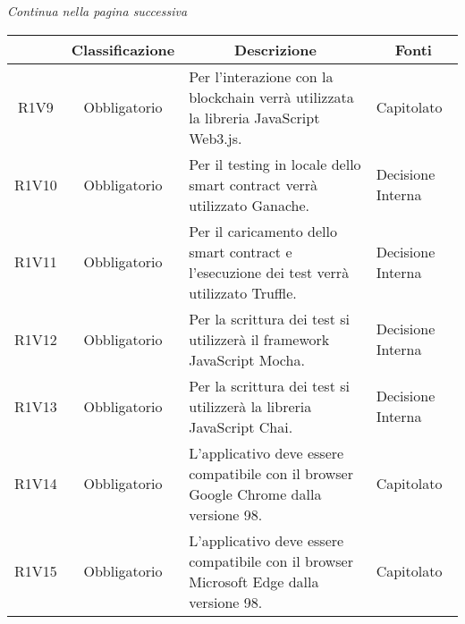 \begin{center}
    \textit{\small Continua nella pagina successiva}
\end{center}
\begin{table}[H]
    \centering
    \renewcommand{\arraystretch}{1.8}
    \begin{tabular}{c | c | p{6cm} | p{4.1cm}}
        \rowcolor[HTML]{125E28}
        \multicolumn{1}{c}{\color[HTML]{FFFFFF} \textbf{Codice}}          &
        \multicolumn{1}{c}{\color[HTML]{FFFFFF} \textbf{Classificazione}} &
        \multicolumn{1}{c}{\color[HTML]{FFFFFF} \textbf{Descrizione}}     &
        \multicolumn{1}{c}{\color[HTML]{FFFFFF} \textbf{Fonti}}                                                                                                                                                                   \\
        \hline
        R1V9                                                              & Obbligatorio & Per l'interazione con la blockchain\glo{} verrà utilizzata la libreria JavaScript\glo{} Web3.js\glo{}.        & Capitolato               \\
        R1V10                                                             & Obbligatorio & Per il testing in locale dello smart contract\glo{} verrà utilizzato Ganache\glo{}.                           & Decisione Interna        \\
        R1V11                                                             & Obbligatorio & Per il caricamento dello smart contract\glo{} e l'esecuzione dei test verrà utilizzato Truffle\glo{}.         & Decisione Interna        \\
        R1V12                                                             & Obbligatorio & Per la scrittura dei test si utilizzerà il framework\glo{} JavaScript\glo{} Mocha\glo{}.                      & Decisione Interna        \\
        R1V13                                                             & Obbligatorio & Per la scrittura dei test si utilizzerà la libreria JavaScript\glo{} Chai\glo{}.                              & Decisione Interna        \\
        R1V14                                                             & Obbligatorio & L'applicativo deve essere compatibile con il browser Google Chrome\glo{} dalla versione 98.  & Capitolato \\
        R1V15                                                             & Obbligatorio & L'applicativo deve essere compatibile con il browser Microsoft Edge\glo{} dalla versione 98. & Capitolato \\

\end{tabular}
\end{table}
